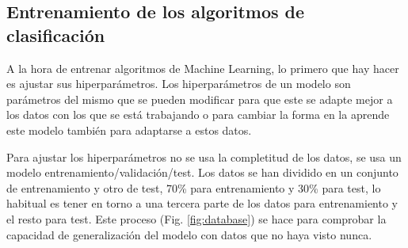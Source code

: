 \begin{table}[htpb!]
    \centering
    \caption{Equivalencia entre algoritmo e implementación}
    \label{tab:equiv_models}
\end{table}

\subsection{Entrenamiento de los algoritmos de clasificación}


A la hora de entrenar algoritmos de Machine Learning, lo primero que hay hacer es ajustar sus hiperparámetros. Los hiperparámetros de un modelo son parámetros del mismo que se pueden modificar para que este se adapte mejor a los datos con los que se está trabajando o para cambiar la forma en la aprende este modelo también para adaptarse a estos datos.

Para ajustar los hiperparámetros no se usa la completitud de los datos, se usa un modelo entrenamiento/validación/test. Los datos se han dividido en un conjunto de entrenamiento y otro de test, 70\% para entrenamiento y 30\% para test, lo habitual es tener en torno a una tercera parte de los datos para entrenamiento y el resto para test. Este proceso (Fig. \ref{fig:database}) se hace para comprobar la capacidad de generalización del modelo con datos que no haya visto nunca.

